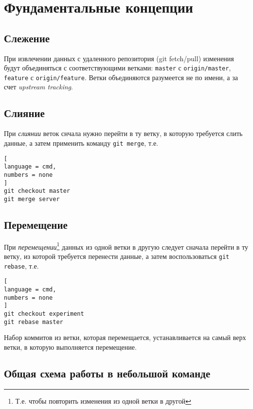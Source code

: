 \documentclass[%
	11pt,
	a4paper,
	utf8,
		]{article}
\begin{document}
\section{Фундаментальные концепции}

\subsection{Слежение}

При извлечении данных с удаленного репозитория (git fetch/pull) изменения будут объединяться с соответствующими ветками: \texttt{master} с \texttt{origin/master}, \texttt{feature} с \texttt{origin/feature}. Ветки объединяются разумеется не по имени, а за счет \emph{upstream tracking}. 

\subsection{Слияние}

При \emph{слиянии} веток снчала нужно перейти в ту ветку, в которую требуется слить данные, а затем применить команду \texttt{git merge}, т.е.

\begin{lstlisting}[
language = cmd,
numbers = none
]
git checkout master
git merge server
\end{lstlisting}

\subsection{Перемещение}

При \emph{перемещении}\footnote{Т.е. чтобы повторить изменения из одной ветки в другой} данных из одной ветки в другую следует сначала перейти в ту ветку, из которой требуется перенести данные, а затем воспользоваться \texttt{git rebase}, т.е.

\begin{lstlisting}[
language = cmd,
numbers = none
]
git checkout experiment
git rebase master
\end{lstlisting}

Набор коммитов из ветки, которая перемещается, устанавливается на самый верх ветки, в которую выполняется перемещение.

\subsection{Общая схема работы в небольшой команде}
\end{document}

